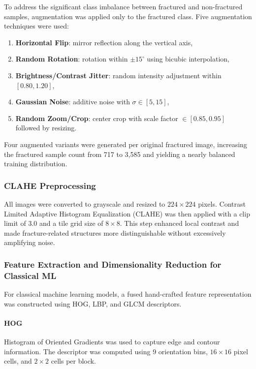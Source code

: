 \documentclass[conference]{IEEEtran}
\begin{document}
To address the significant class imbalance between fractured and non-fractured samples, augmentation was applied only to the fractured class. Five augmentation techniques were used:
\begin{enumerate}
    \item \textbf{Horizontal Flip}: mirror reflection along the vertical axis,
    \item \textbf{Random Rotation}: rotation within $\pm15^\circ$ using bicubic interpolation,
    \item \textbf{Brightness/Contrast Jitter}: random intensity adjustment within $[0.80, 1.20]$,
    \item \textbf{Gaussian Noise}: additive noise with $\sigma \in [5, 15]$,
    \item \textbf{Random Zoom/Crop}: center crop with scale factor $\in [0.85, 0.95]$ followed by resizing.
\end{enumerate}

Four augmented variants were generated per original fractured image, increasing the fractured sample count from 717 to 3,585 and yielding a nearly balanced training distribution.

\subsubsection{CLAHE Preprocessing}

All images were converted to grayscale and resized to $224 \times 224$ pixels. Contrast Limited Adaptive Histogram Equalization (CLAHE) was then applied with a clip limit of 3.0 and a tile grid size of $8 \times 8$. This step enhanced local contrast and made fracture-related structures more distinguishable without excessively amplifying noise.

\subsubsection{Feature Extraction and Dimensionality Reduction for Classical ML}

For classical machine learning models, a fused hand-crafted feature representation was constructed using HOG, LBP, and GLCM descriptors.

\paragraph{HOG}
Histogram of Oriented Gradients was used to capture edge and contour information. The descriptor was computed using 9 orientation bins, $16 \times 16$ pixel cells, and $2 \times 2$ cells per block.
\end{document}
